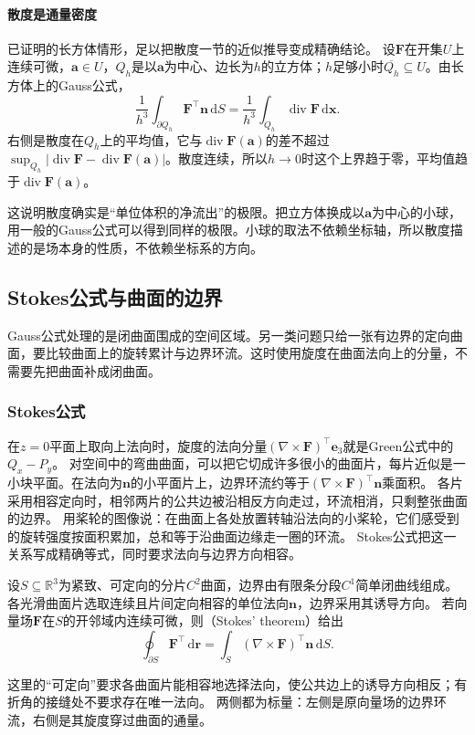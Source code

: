 \paragraph{散度是通量密度}

已证明的长方体情形，足以把散度一节的近似推导变成精确结论。
设$\bm F$在开集$U$上连续可微，$\bm a\in U$，$Q_h$是以$\bm a$为中心、边长为$h$的立方体；$h$足够小时$\overline{Q_h}\subseteq U$。由长方体上的Gauss公式，
\[
 \frac1{h^3}\int_{\partial Q_h}\bm F^\top\bm n\,\mathrm dS
 =\frac1{h^3}\int_{Q_h}\operatorname{div}\bm F\,\mathrm d\bm x.
\]
右侧是散度在$Q_h$上的平均值，它与$\operatorname{div}\bm F(\bm a)$的差不超过$\sup_{Q_h}|\operatorname{div}\bm F-\operatorname{div}\bm F(\bm a)|$。散度连续，所以$h\to0$时这个上界趋于零，平均值趋于$\operatorname{div}\bm F(\bm a)$。

这说明散度确实是“单位体积的净流出”的极限。把立方体换成以$\bm a$为中心的小球，用一般的Gauss公式可以得到同样的极限。小球的取法不依赖坐标轴，所以散度描述的是场本身的性质，不依赖坐标系的方向。

\subsection{Stokes公式与曲面的边界}

Gauss公式处理的是闭曲面围成的空间区域。另一类问题只给一张有边界的定向曲面，要比较曲面上的旋转累计与边界环流。这时使用旋度在曲面法向上的分量，不需要先把曲面补成闭曲面。

\subsubsection{Stokes公式}

在$z=0$平面上取向上法向时，旋度的法向分量$(\nabla\times\bm F)^\top\bm e_3$就是Green公式中的$Q_x-P_y$。
对空间中的弯曲曲面，可以把它切成许多很小的曲面片，每片近似是一小块平面。在法向为$\bm n$的小平面片上，边界环流约等于$(\nabla\times\bm F)^\top\bm n$乘面积。
各片采用相容定向时，相邻两片的公共边被沿相反方向走过，环流相消，只剩整张曲面的边界。
用桨轮的图像说：在曲面上各处放置转轴沿法向的小桨轮，它们感受到的旋转强度按面积累加，总和等于沿曲面边缘走一圈的环流。
Stokes公式把这一关系写成精确等式，同时要求法向与边界方向相容。
\begin{theorem}[Stokes定理]
\label{thm:multivariable-stokes}
设$S\subseteq\mathbb R^3$为紧致、可定向的分片$C^2$曲面，边界由有限条分段$C^1$简单闭曲线组成。
各光滑曲面片选取连续且片间定向相容的单位法向$\bm n$，边界采用其诱导方向。
若向量场$\bm F$在$S$的开邻域内连续可微，则（Stokes' theorem）给出
\begin{equation}
 \oint_{\partial S}\bm F^\top\,\mathrm d\bm r
 =\int_S(\nabla\times\bm F)^\top\bm n\,\mathrm dS.
 \label{eq:multivariable-stokes}
\end{equation}
\end{theorem}
这里的“可定向”要求各曲面片能相容地选择法向，使公共边上的诱导方向相反；有折角的接缝处不要求存在唯一法向。
两侧都为标量：左侧是原向量场的边界环流，右侧是其旋度穿过曲面的通量。

